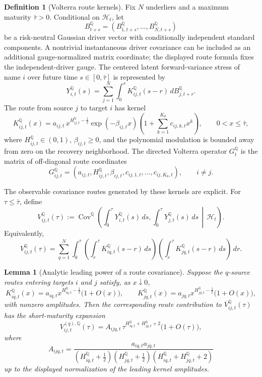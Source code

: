 \documentclass[11pt,a4paper]{amsart}
\theoremstyle{plain}
\newtheorem{lemma}[theorem]{Lemma}
\theoremstyle{definition}
\newtheorem{definition}[theorem]{Definition}
\theoremstyle{remark}
\DeclareMathOperator{\Cov}{Cov}
\newcommand{\QQ}{\mathbb{Q}}
\newcommand{\cH}{\mathcal{H}}
\newcommand{\dd}{\,d}
\begin{document}
\begin{definition}[Volterra route kernels]\label{def:volterra-route-kernels}
Fix \(N\) underliers and a maximum maturity \(\bar\tau>0\).  Conditional on \(\cH_t\), let
\[
        B^\QQ_{t+s}=(B^\QQ_{1,t+s},\dots,B^\QQ_{N,t+s})
\]
be a risk-neutral Gaussian driver vector with conditionally independent standard components.  A
nontrivial instantaneous driver covariance can be included as an additional gauge-normalized
matrix coordinate; the displayed route formula fixes the independent-driver gauge.  The centered
latent forward-variance stress of name \(i\) over future time \(s\in[0,\bar\tau]\) is represented by
\[
        Y_{i,t}^\QQ(s)
        =
        \sum_{j=1}^N
        \int_0^s K_{ij,t}^\QQ(s-r)\dd B^\QQ_{j,t+r}.
\]
The route from source \(j\) to target \(i\) has kernel
\[
        K_{ij,t}^\QQ(x)
        =
        a_{ij,t}\,
        x^{H_{ij,t}^\QQ-\frac12}
        \exp(-\beta_{ij,t}x)
        \left(1+\sum_{k=1}^{K_0} c_{ij,k,t}x^k\right),
        \qquad 0<x\le\bar\tau,
\]
where \(H_{ij,t}^\QQ\in(0,1)\), \(\beta_{ij,t}\ge0\), and the polynomial modulation is bounded
away from zero on the recovery neighborhood.  The directed Volterra operator \(G_t^\QQ\) is the
matrix of off-diagonal route coordinates
\[
        G_{ij,t}^\QQ=(a_{ij,t},H_{ij,t}^\QQ,\beta_{ij,t},c_{ij,1,t},\dots,c_{ij,K_0,t}),
        \qquad i\ne j.
\]
\end{definition}

The observable covariance routes generated by these kernels are explicit.  For
\(\tau\le\bar\tau\), define
\[
        V_{ij,t}^\QQ(\tau)
        :=
        \Cov^\QQ\!\left(
        \int_0^\tau Y_{i,t}^\QQ(s)\dd s,
        \int_0^\tau Y_{j,t}^\QQ(s)\dd s
        \,\middle|\,\cH_t
        \right).
\]
Equivalently,
\[
        V_{ij,t}^\QQ(\tau)
        =
        \sum_{q=1}^N
        \int_0^\tau
        \left(\int_r^\tau K_{iq,t}^\QQ(s-r)\dd s\right)
        \left(\int_r^\tau K_{jq,t}^\QQ(s-r)\dd s\right)\dd r .
\]
\begin{lemma}[Analytic leading power of a route covariance]\label{lem:route-leading-power}
Suppose the \(q\)-source routes entering targets \(i\) and \(j\) satisfy, as \(x\downarrow0\),
\[
        K_{iq,t}^\QQ(x)
        =
        a_{iq,t}x^{H_{iq,t}^\QQ-\frac12}\bigl(1+O(x)\bigr),
        \qquad
        K_{jq,t}^\QQ(x)
        =
        a_{jq,t}x^{H_{jq,t}^\QQ-\frac12}\bigl(1+O(x)\bigr),
\]
with nonzero amplitudes.  Then the corresponding route contribution to
\(V_{ij,t}^\QQ(\tau)\) has the short-maturity expansion
\[
        V_{ij,t}^{(q),\QQ}(\tau)
        =
        A_{ijq,t}\,
        \tau^{H_{iq,t}^\QQ+H_{jq,t}^\QQ+2}
        \bigl(1+O(\tau)\bigr),
\]
where
\[
        A_{ijq,t}
        =
        \frac{a_{iq,t}a_{jq,t}}
        {(H_{iq,t}^\QQ+\frac12)(H_{jq,t}^\QQ+\frac12)
        (H_{iq,t}^\QQ+H_{jq,t}^\QQ+2)}
\]
up to the displayed normalization of the leading kernel amplitudes.
\end{lemma}
\end{document}
